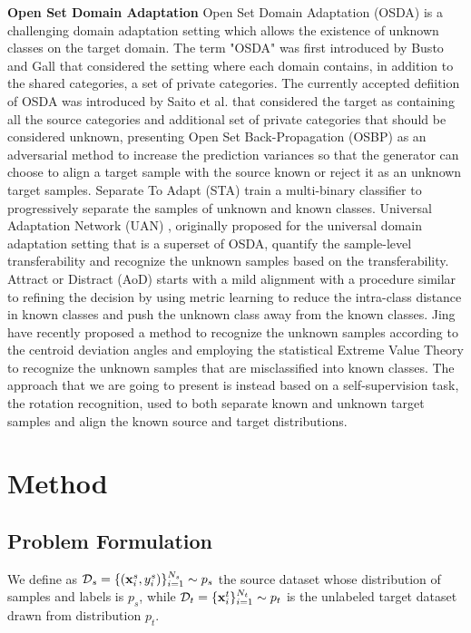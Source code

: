 \documentclass[10pt,twocolumn,letterpaper]{article}
\begin{document}
\textbf{Open Set Domain Adaptation}
Open Set Domain Adaptation (OSDA) is a challenging domain adaptation setting 
which allows the existence of unknown classes on the target domain.
The term "OSDA" was first introduced by Busto and Gall \cite{firstosda} that
considered the setting where each domain contains, in addition to the shared
categories, a set of private categories. The currently accepted defiition of OSDA
was introduced by Saito et al. \cite{saito2018open} that considered the target as 
containing all the source categories and additional set of private categories 
that should be considered unknown, presenting Open Set
Back-Propagation (OSBP) \cite{saito2018open} as an adversarial method 
to increase the prediction variances so that the generator can choose to align 
a target sample with the source known or reject it as an unknown target samples.
Separate To Adapt (STA) \cite{sat} train a multi-binary classifier to progressively 
separate the samples of unknown and known classes.
Universal Adaptation Network (UAN) \cite{uan}, originally proposed for the universal 
domain adaptation setting that is a superset of OSDA, quantify the sample-level 
transferability and recognize the unknown samples based on the transferability.
Attract or Distract (AoD) \cite{feng2019attract} starts with a mild alignment with 
a procedure similar to \cite{saito2018open} refining the decision by using 
metric learning to reduce the intra-class distance in known classes and push 
the unknown class away from the known classes.
Jing \etal \cite{Jing_Li_Zhu_Ding_Lu_Yang_2021} have recently proposed a method
to recognize the unknown samples according to the centroid deviation angles and
employing the statistical Extreme Value Theory to recognize the unknown 
samples that are misclassified into known classes.
The approach that we are going to present is instead based on a self-supervision 
task, the rotation recognition, used to both separate known and unknown target 
samples and align the known source and target distributions.
\section{Method}
\label{sec:method}

\subsection{Problem Formulation}
\label{sec:problemformulation}
We define as $\mathcal{D}_s = \{({\bf x}_i^s, y_i^s)\}_{i=1}^{N_s} \sim p_s$ the source dataset whose distribution of samples and labels is $p_s$,
while $\mathcal{D}_t = \{{\bf x}_i^t\}_{i=1}^{N_t} \sim p_t$ is the unlabeled target dataset drawn from distribution $p_t$. 
\end{document}
